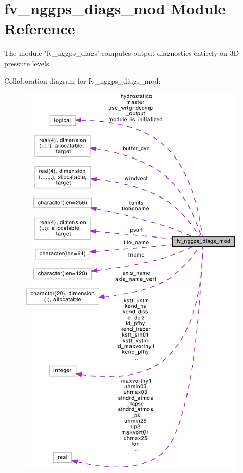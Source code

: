 \section{fv\-\_\-nggps\-\_\-diags\-\_\-mod Module Reference}
\label{classfv__nggps__diags__mod}


The module 'fv\-\_\-nggps\-\_\-diags' computes output diagnostics entirely on 3\-D pressure levels.  




Collaboration diagram for fv\-\_\-nggps\-\_\-diags\-\_\-mod\-:
\nopagebreak
\begin{figure}[H]
\begin{center}
\leavevmode
\includegraphics[height=550pt]{classfv__nggps__diags__mod__coll__graph}
\end{center}
\end{figure}
